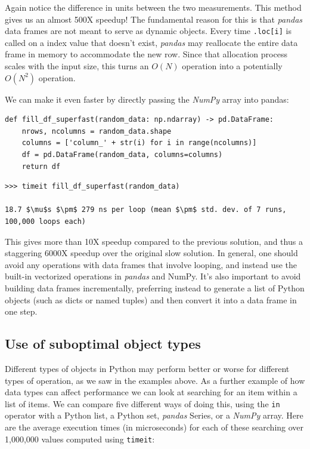 Again notice the difference in units between the two measurements.  This method gives us an almost 500X speedup!  The fundamental reason for this is that \textit{pandas} data frames are not meant to serve as dynamic objects.  Every time \texttt{.loc[i]} is called on a index value that doesn't exist, \textit{pandas} may reallocate the entire data frame in memory to accommodate the new row. Since that allocation process scales with the input size, this turns an $O(N)$ operation into a potentially $O(N^2)$ operation.

We can make it even faster by directly passing the \textit{NumPy} array into pandas:

\begin{lstlisting}[style=Python]
def fill_df_superfast(random_data: np.ndarray) -> pd.DataFrame:
    nrows, ncolumns = random_data.shape
    columns = ['column_' + str(i) for i in range(ncolumns)]
    df = pd.DataFrame(random_data, columns=columns)
    return df

\end{lstlisting}

\begin{lstlisting}[style=replshort, mathescape=true]
>>> timeit fill_df_superfast(random_data)

18.7 $\mu$s $\pm$ 279 ns per loop (mean $\pm$ std. dev. of 7 runs, 100,000 loops each)
\end{lstlisting}

This gives more than 10X speedup compared to the previous solution, and thus a staggering 6000X speedup over the original slow solution. In general, one should avoid any operations with data frames that involve looping, and instead use the built-in vectorized operations in \textit{pandas} and NumPy.  It's also important to avoid building data frames incrementally, preferring instead to generate a list of Python objects (such as dicts or named tuples) and then convert it into a data frame in one step.

\subsection{Use of suboptimal object types}

Different types of objects in Python may perform better or worse for different types of operation, as we saw in the examples above.  As a further example of how data types can affect performance we can look at searching for an item within a list of items. We can compare five different ways of doing this, using the \texttt{in} operator with a Python list, a Python set, \textit{pandas} Series, or a \textit{NumPy} array.  Here are the average execution times (in microseconds) for each of these searching over 1,000,000 values computed using \texttt{timeit}:

